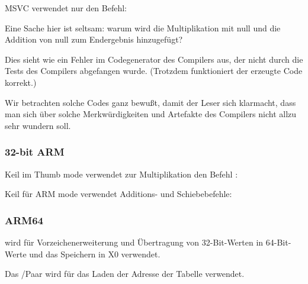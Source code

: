 

\NonOptimizing MSVC verwendet nur den \IMUL Befehl:



\myindex{\CompilerAnomaly}
\label{MSVC2013_anomaly}
Eine Sache hier ist seltsam: warum wird die Multiplikation mit null und die Addition von null zum Endergebnis
hinzugefügt?

Dies sieht wie ein Fehler im Codegenerator des Compilers aus, der nicht durch die Tests des Compilers abgefangen wurde.
(Trotzdem funktioniert der erzeugte Code korrekt.)

%
Wir betrachten solche Codes ganz bewußt, damit der Leser sich klarmacht, dass man sich über solche Merkwürdigkeiten und
Artefakte des Compilers nicht allzu sehr wundern soll.

\subsubsection{32-bit ARM}

\Optimizing Keil im Thumb mode verwendet zur Multiplikation den Befehl :



\Optimizing Keil für ARM mode verwendet Additions- und Schiebebefehle:



\subsubsection{ARM64}



 wird für Vorzeichenerweiterung und Übertragung von 32-Bit-Werten in 64-Bit-Werte und das Speichern in X0
verwendet.

Das \ADRP/\ADD Paar wird für das Laden der Adresse der Tabelle verwendet.

